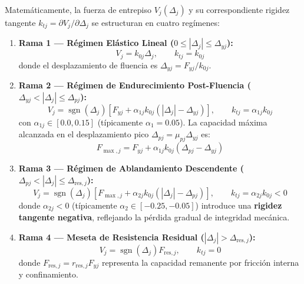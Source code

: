 \documentclass[11pt,letterpaper]{article}
\begin{document}
Matemáticamente, la fuerza de entrepiso $V_j(\Delta_j)$ y su correspondiente rigidez tangente $k_{tj} = \partial V_j / \partial \Delta_j$ se estructuran en cuatro regímenes:

\begin{enumerate}
    \item \textbf{Rama 1 --- Régimen Elástico Lineal ($0 \le |\Delta_j| \le \Delta_{yj}$):}
    \begin{equation}
        V_j = k_{0j} \Delta_j, \qquad k_{tj} = k_{0j}
    \end{equation}
    donde el desplazamiento de fluencia es $\Delta_{yj} = F_{yj} / k_{0j}$.
    
    \item \textbf{Rama 2 --- Régimen de Endurecimiento Post-Fluencia ($\Delta_{yj} < |\Delta_j| \le \Delta_{pj}$):}
    \begin{equation}
        V_j = \operatorname{sgn}(\Delta_j) \left[ F_{yj} + \alpha_{1j} k_{0j} \left(|\Delta_j| - \Delta_{yj}\right) \right], \qquad k_{tj} = \alpha_{1j} k_{0j}
    \end{equation}
    con $\alpha_{1j} \in [0.0, 0.15]$ (típicamente $\alpha_1 = 0.05$). La capacidad máxima alcanzada en el desplazamiento pico $\Delta_{pj} = \mu_{pj} \Delta_{yj}$ es:
    \begin{equation}
        F_{\max,j} = F_{yj} + \alpha_{1j} k_{0j} (\Delta_{pj} - \Delta_{yj})
    \end{equation}
    
    \item \textbf{Rama 3 --- Régimen de Ablandamiento Descendente ($\Delta_{pj} < |\Delta_j| \le \Delta_{\text{res},j}$):}
    \begin{equation}
        V_j = \operatorname{sgn}(\Delta_j) \left[ F_{\max,j} + \alpha_{2j} k_{0j} \left(|\Delta_j| - \Delta_{pj}\right) \right], \qquad k_{tj} = \alpha_{2j} k_{0j} < 0
    \end{equation}
    donde $\alpha_{2j} < 0$ (típicamente $\alpha_2 \in [-0.25, -0.05]$) introduce una \textbf{rigidez tangente negativa}, reflejando la pérdida gradual de integridad mecánica.
    
    \item \textbf{Rama 4 --- Meseta de Resistencia Residual ($|\Delta_j| > \Delta_{\text{res},j}$):}
    \begin{equation}
        V_j = \operatorname{sgn}(\Delta_j) F_{\text{res},j}, \qquad k_{tj} = 0
    \end{equation}
    donde $F_{\text{res},j} = r_{\text{res},j} F_{yj}$ representa la capacidad remanente por fricción interna y confinamiento.
\end{enumerate}
\end{document}
